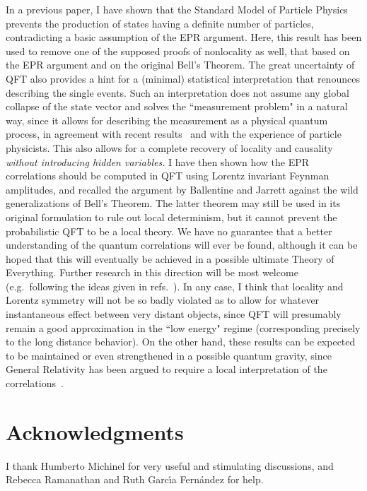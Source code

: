 \documentclass[12pt]{article}
\begin{document}
In a previous paper, I have shown that the Standard Model of Particle
Physics prevents the production of states having a definite number of
particles, contradicting a basic assumption of the EPR argument. Here,
this result has been used to remove one of the supposed proofs of
nonlocality as well, that based on the EPR argument and on the
original Bell's Theorem.  The great uncertainty of QFT also provides a
hint for a (minimal) statistical interpretation that renounces
describing the single events. Such an interpretation does not assume
any global collapse of the state vector and solves the ``measurement
problem" in a natural way, since it allows for describing the
measurement as a physical quantum process, in agreement with recent
results~\cite{Zeno} and with the experience of particle
physicists. This also allows for a complete recovery of locality and
causality {\it without introducing hidden variables.} I have then
shown how the EPR correlations should be computed in QFT using Lorentz
invariant Feynman amplitudes, and recalled the argument by Ballentine
and Jarrett against the wild generalizations of Bell's Theorem. The
latter theorem may still be used in its original formulation to rule
out local determinism, but it cannot prevent the probabilistic QFT to
be a local theory. We have no guarantee that a better understanding of
the quantum correlations will ever be found, although it can be hoped
that this will eventually be achieved in a possible ultimate Theory of
Everything. Further research in this direction will be most welcome
(e.g.\ following the ideas given in refs.~\cite{Porto,Czachor}). In
any case, I think that locality and Lorentz symmetry will not be so
badly violated as to allow for whatever instantaneous effect between
very distant objects, since QFT will presumably remain a good
approximation in the ``low energy" regime (corresponding precisely to
the long distance behavior). On the other hand, these results can be
expected to be maintained or even strengthened in a possible quantum
gravity, since General Relativity has been argued to require a local
interpretation of the correlations~\cite{Mensky}.

\section{Acknowledgments}

I thank Humberto Michinel for very useful and stimulating discussions,
and Rebecca Ramanathan and Ruth Garc\'\i a Fern\'andez for help.
\end{document}

